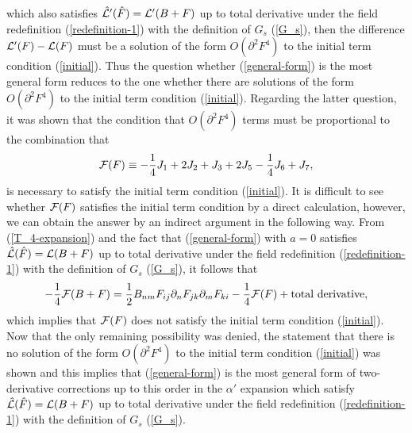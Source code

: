 \documentclass[a4paper,12pt]{article}
\begin{document}
which also satisfies
$\hat{{\cal L}}' (\hat{F}) = {\cal L}' (B+F)$
up to total derivative under the field redefinition
(\ref{redefinition-1}) with the definition of $G_s$ (\ref{G_s}),
then the difference
${\cal L}' (F) - {\cal L} (F)$
must be a solution of the form $O(\partial^2 F^4)$
to the initial term condition (\ref{initial}).
Thus the question whether (\ref{general-form}) is
the most general form reduces to the one
whether there are solutions of the form $O(\partial^2 F^4)$
to the initial term condition (\ref{initial}).
Regarding the latter question,
it was shown \cite{Okawa} that the condition that
$O(\partial^2 F^4)$ terms must be proportional to
the combination that
\begin{equation}
{\cal F} (F) \equiv -\frac{1}{4} J_1 + 2 J_2 + J_3
+2 J_5 -\frac{1}{4} J_6 + J_7,
\label{necessary}
\end{equation}
is necessary
to satisfy the initial term condition (\ref{initial}).
It is difficult to see whether
${\cal F} (F)$ satisfies the initial term condition
by a direct calculation, however, we can obtain the answer
by an indirect argument in the following way. From
(\ref{T_4-expansion}) and the fact that
(\ref{general-form}) with $a=0$ satisfies
$\hat{{\cal L}} (\hat{F}) = {\cal L} (B+F)$
up to total derivative under the field redefinition
(\ref{redefinition-1}) with the definition of $G_s$ (\ref{G_s}),
it follows that
\begin{equation}
-\frac{1}{4} {\cal F} (B+F) =
\frac{1}{2} B_{nm}
F_{ij} \partial_n F_{jk} \partial_m F_{ki}
-\frac{1}{4} {\cal F} (F)
+ {\rm total~derivative},
\end{equation}
which implies that ${\cal F} (F)$ does not satisfy
the initial term condition (\ref{initial}).
Now that the only remaining possibility was denied,
the statement that
there is no solution of the form $O(\partial^2 F^4)$
to the initial term condition (\ref{initial})
was shown and this implies
that (\ref{general-form}) is the most general form
of two-derivative corrections
up to this order in the $\alpha'$ expansion
which satisfy
$\hat{{\cal L}} (\hat{F}) = {\cal L} (B+F)$
up to total derivative under the field redefinition
(\ref{redefinition-1}) with the definition of $G_s$ (\ref{G_s}).
\end{document}
